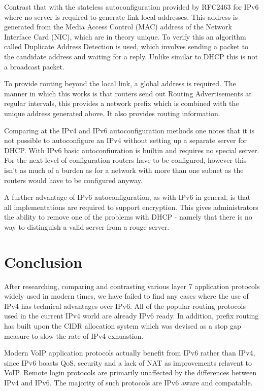 \documentclass[a4paper,12pt]{article}
\begin{document}
Contrast that with the stateless autoconfiguration provided by RFC2463 for
IPv6 where no server is required to generate link-local addresses. This address
is generated from the Media Access Control (MAC) address of the Network
Interface Card (NIC), which are in theory unique. To verify this an algorithm called
Duplicate Address Detection is used, which involves sending a packet to the
candidate address and waiting for a reply. Unlike similar to DHCP this is not a
broadcast packet.


To provide routing beyond the local link, a global address is required. The
manner in which this works is that routers send out Routing Advertisements at
regular intervals, this provides a network prefix which is combined with the
unique address generated above. It also provides routing information.


Comparing at the IPv4 and IPv6 autoconfiguration methods one notes that it is
not possible to autoconfigure an IPv4 without setting up a separate server for
DHCP. With IPv6 basic autoconfiuration is builtin and requires no special
server. For the next level of configuration routers have to be configured,
however this isn't as much of a burden as for a network with more than one
subnet as the routers would have to be configured anyway.


A further advantage of IPv6 autoconfiguration, as with IPv6 in general, is that
all implementations are required to support encryption. This gives
administrators the ability to remove one of the problems with DHCP - namely
that there is no way to distinguish a valid server from a rouge server.

\section{Conclusion}

After researching, comparing and contrasting various layer 7 application
protocols widely used in modern times, we have failed to find any cases
where the use of IPv4 has technical advantages over IPv6. All of the
popular routing protocols used in the current IPv4 world are already
IPv6 ready. In addition, prefix routing has built upon the CIDR
allocation system which was devised as a stop gap measure to slow the 
rate of IPv4 exhuastion.


Modern VoIP application protocols actually benefit from IPv6 rather than
IPv4, since IPv6 boasts QoS, security and a lack of NAT as improvements
relavent to VoIP. Remote login protocols are primarily unaffected by the
differences between IPv4 and IPv6. The majority of such protocols are
IPv6 aware and compatable.
\end{document}
